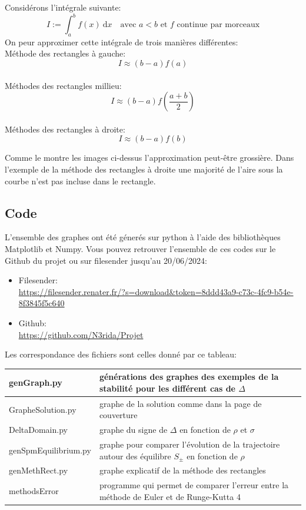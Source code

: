 \documentclass{article}
\newtheorem[M , nocut]{prop}{Proposition}[section]
\newtheorem[M , nocut]{definition}{Définition}
\newtheorem[M , nocut]{lemme}{Lemme}
\newtheorem[L , nocut]{thm}{Théoreme}
\newtheorem[M , nocut]{cor}{Corollaire}
\begin{document}
Considérons l'intégrale suivante:
\[
  I := \int_a^b f(x)\ \mathrm{d}x\quad \text{avec }a<b \text{ et } f \text{ continue par morceaux}
\] 
On peur approximer cette intégrale de trois manières différentes:\\
Méthode des rectangles à gauche:
\[
    I \approx (b-a) f(a)
\]\\
Méthodes des rectangles millieu:
\[
    I \approx (b-a) f(\frac{a+b}{2})
\]\\
Méthodes des rectangles à droite:
\[
    I \approx (b-a) f(b)
\]
\begin{example}[Remarque]
    Comme le montre les images ci-dessus l'approximation peut-être grossière. Dans l'exemple de la méthode des rectangles à droite une majorité de l'aire sous la courbe n'est pas incluse dans le rectangle.
\end{example}

\subsection*{Code}
L'ensemble des graphes ont été génerés sur python à l'aide des bibliothèques Matplotlib et Numpy. Vous pouvez retrouver l'ensemble de ces codes sur le Github du projet ou sur filesender jusqu'au 20/06/2024:
\begin{itemize}
    \item Filesender:\\ \url{https://filesender.renater.fr/?s=download&token=8ddd43a9-c73c-4fc9-b54e-8f3845f5c640}
    \item Github:\\ \url{https://github.com/N3rida/Projet}
\end{itemize}
Les correspondance des fichiers sont celles donné par ce tableau:\\
\begin{tabular}{|m{}|m{}|}
    \hline
    genGraph.py & générations des graphes des exemples de la stabilité pour les différent cas de $\Delta$\\
    \hline
    GrapheSolution.py & graphe de la solution comme dans la page de couverture\\
    \hline
    DeltaDomain.py & graphe du signe de $\Delta$ en fonction de $\rho$ et $\sigma$\\
    \hline
    genSpmEquilibrium.py & graphe pour comparer l'évolution de la trajectoire autour des équilibre $S_\pm$ en fonction de $\rho$\\
    \hline
    genMethRect.py & graphe explicatif de la méthode des rectangles\\
    \hline
    methodsError & programme qui permet de comparer l'erreur entre la méthode de Euler et de Runge-Kutta 4\\
    \hline
\end{tabular}

\newpage
\nocite{*}
\printbibliography[heading=bibintoc,title={Bibliographie}]
\end{document}
